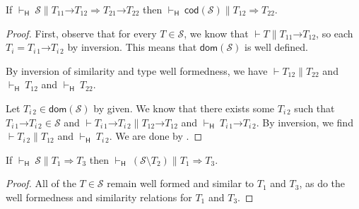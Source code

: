 \documentclass[9pt]{extarticle}
\newcommand{\ottnt}[1]{\mathit{#1}}
\newcommand{\ottmv}[1]{\mathit{#1}}
\newcommand{\ottsym}[1]{#1}
\begin{document}
{\begin{lemma}
  \label{lem:heedfulcodwf}
  If $ \mathord{  \vdash _{  \mathsf{H}  } }~ \mathcal{S}   \mathrel{\parallel}    \ottnt{T_{{\mathrm{11}}}} \mathord{ \rightarrow } \ottnt{T_{{\mathrm{12}}}}   \Rightarrow   \ottnt{T_{{\mathrm{21}}}} \mathord{ \rightarrow } \ottnt{T_{{\mathrm{22}}}}  $ then $ \mathord{  \vdash _{  \mathsf{H}  } }~  \mathsf{cod} ( \mathcal{S} )    \mathrel{\parallel}   \ottnt{T_{{\mathrm{12}}}}  \Rightarrow  \ottnt{T_{{\mathrm{22}}}} $.
\begin{proof}
    First, observe that for every $ \ottnt{T}  \in  \mathcal{S} $, we know that $\vdash  \ottnt{T}  \mathrel{\parallel}   \ottnt{T_{{\mathrm{11}}}} \mathord{ \rightarrow } \ottnt{T_{{\mathrm{12}}}} $, so each $\ottnt{T_{\ottmv{i}}}  \ottsym{=}   \ottnt{T_{\ottmv{i}\,{\mathrm{1}}}} \mathord{ \rightarrow } \ottnt{T_{\ottmv{i}\,{\mathrm{2}}}} $ by inversion. This
    means that $ \mathsf{dom} ( \mathcal{S} ) $ is well defined.

    By inversion of similarity and type well formedness, we have $\vdash  \ottnt{T_{{\mathrm{12}}}}  \mathrel{\parallel}  \ottnt{T_{{\mathrm{22}}}}$ and $ \mathord{  \vdash _{  \mathsf{H}  } }~ \ottnt{T_{{\mathrm{12}}}} $ and $ \mathord{  \vdash _{  \mathsf{H}  } }~ \ottnt{T_{{\mathrm{22}}}} $.

    Let $ \ottnt{T_{\ottmv{i}\,{\mathrm{2}}}}  \in   \mathsf{dom} ( \mathcal{S} )  $ by given. We know that there exists some
    $\ottnt{T_{\ottmv{i}\,{\mathrm{2}}}}$ such that $  \ottnt{T_{\ottmv{i}\,{\mathrm{1}}}} \mathord{ \rightarrow } \ottnt{T_{\ottmv{i}\,{\mathrm{2}}}}   \in  \mathcal{S} $ and $\vdash   \ottnt{T_{\ottmv{i}\,{\mathrm{1}}}} \mathord{ \rightarrow } \ottnt{T_{\ottmv{i}\,{\mathrm{2}}}}   \mathrel{\parallel}   \ottnt{T_{{\mathrm{12}}}} \mathord{ \rightarrow } \ottnt{T_{{\mathrm{12}}}} $ and $ \mathord{  \vdash _{  \mathsf{H}  } }~  \ottnt{T_{\ottmv{i}\,{\mathrm{1}}}} \mathord{ \rightarrow } \ottnt{T_{\ottmv{i}\,{\mathrm{2}}}}  $. By inversion, we find $\vdash  \ottnt{T_{\ottmv{i}\,{\mathrm{2}}}}  \mathrel{\parallel}  \ottnt{T_{{\mathrm{12}}}}$ and $ \mathord{  \vdash _{  \mathsf{H}  } }~ \ottnt{T_{\ottmv{i}\,{\mathrm{2}}}} $. We are done by .
  \end{proof} 
\end{lemma}

\begin{lemma}
  \label{lem:typesetreduce}
  If $ \mathord{  \vdash _{  \mathsf{H}  } }~ \mathcal{S}   \mathrel{\parallel}   \ottnt{T_{{\mathrm{1}}}}  \Rightarrow  \ottnt{T_{{\mathrm{3}}}} $ then $ \mathord{  \vdash _{  \mathsf{H}  } }~ \ottsym{(}   \mathcal{S}  \setminus  \ottnt{T_{{\mathrm{2}}}}   \ottsym{)}   \mathrel{\parallel}   \ottnt{T_{{\mathrm{1}}}}  \Rightarrow  \ottnt{T_{{\mathrm{3}}}} $.
\begin{proof}
    All of the $ \ottnt{T}  \in  \mathcal{S} $ remain well formed and similar to $\ottnt{T_{{\mathrm{1}}}}$
    and $\ottnt{T_{{\mathrm{3}}}}$, as do the well formedness and similarity relations
    for $\ottnt{T_{{\mathrm{1}}}}$ and $\ottnt{T_{{\mathrm{3}}}}$.
  \end{proof}
\end{lemma}

}
\end{document}
